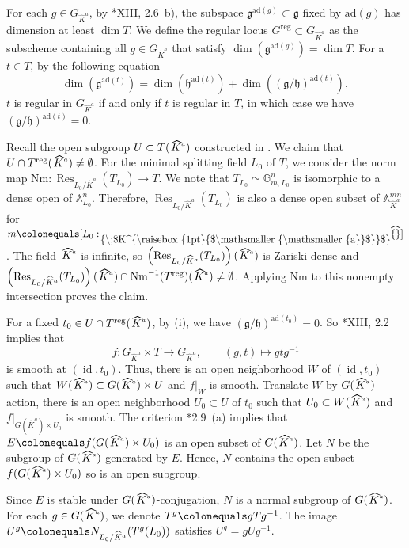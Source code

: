 \documentclass[a4paper,11pt,reqno]{amsart}
\newcommand{\bA}{\mathbb{A}}
\newcommand{\bG}{\mathbb{G}}
\newcommand{\fg}{\mathfrak{g}}
\newcommand{\fh}{\mathfrak{h}}
\newcommand{\ra}{\rightarrow}
\newcommand{\wh}{\widehat}
\newcommand{\ce}{\colonequals}
\newcommand{\isom}{\simeq}			                                               %
\newcommand{\hka}{\!\stackon[-8pt]{\;$K^{\raisebox{1pt}{$\mathsmaller{\mathsmaller{a}}$}}$}{\vstretch{1.5}{\hstretch{1.7}{\widehat{\phantom{}}}}}}
\newcommand{\nhka}{\wh{K}^a}
\providecommand{\p}[1]{\left(#1\right)}
\DeclareMathOperator{\id}{id}			                       %
\DeclareMathOperator{\Res}{Res}		                                                  %
\newcommand{\qq}{\quad\quad}
\newcommand{\reg}{^{\mathrm{reg}}}
\theoremstyle{plain}
\theoremstyle{remark}
\theoremstyle{definition}
\theoremstyle{plain}
\theoremstyle{definition}
\theoremstyle{subsection-tweak}
\theoremstyle{subsection-tweak}
\numberwithin{equation}{subsection}
\begin{document}
      For each $g\in G_{\nhka}$, by \cite{SGA3II}*{XIII, 2.6~b)}, the subspace $\fg^{\mathrm{ad}(g)}\subset \fg$ fixed by $\mathrm{ad}(g)$ has dimension at least $\dim T$. 
      We define the regular locus $G\reg\subset G_{\nhka}$ as the subscheme containing all $g\in G_{\nhka}$ that satisfy $\dim(\fg^{\mathrm{ad}(g)})=\dim T$.
      For a $t\in T$, by the following equation 
      \[
      \dim(\fg^{\mathrm{ad}(t)})=\dim(\fh^{\mathrm{ad}(t)})+\dim((\fg/\fh)^{\mathrm{ad}(t)}),
      \]
      $t$ is regular in $G_{\nhka}$ if and only if $t$ is regular in $T$, in which case we have $(\fg/\fh)^{\mathrm{ad}(t)}=0$. 
      \item Recall the open subgroup $U\subset T(\hka)$ constructed in .  We claim that $U\cap T^{\mathrm{reg}}(\hka)\neq \emptyset$. 
      For the minimal splitting field $L_0$ of $T$, we consider the norm map $\mathrm{Nm}\colon \Res_{L_0/\nhka}(T_{L_0})\ra T$.
      We note that $T_{L_0}\isom \bG_{m,L_0}^n$ is isomorphic to a dense open of $\bA^n_{L_0}$.
      Therefore, $\Res_{L_0/\nhka}(T_{L_0})$  is also a dense open subset of $\bA^{mn}_{\nhka}$ for $m\ce[L_0:\hka]$.
      The field $\hka$ is infinite, so $\p{\Res_{L_0/\nhka}(T_{L_0})}(\hka)$ is Zariski dense and $\p{\Res_{L_0/\nhka}(T_{L_0})}(\hka)\cap \mathrm{Nm}^{-1}(T^{\mathrm{reg}})(\hka)\neq \emptyset$.
      Applying $\mathrm{Nm}$ to this nonempty intersection proves the claim.
      \item For a fixed $t_{0}\in U\cap T\reg(\hka)$, by (i), we have $(\fg/\fh)^{\mathrm{ad}(t_0)}=0$. 
      So \cite{SGA3II}*{XIII, 2.2} implies that
      \[
      f\colon G_{\nhka}\times T\ra G_{\nhka}, \qq (g,t)\mapsto gtg^{-1}
      \]
      is smooth at $(\id, t_0)$.
      Thus, there is an open neighborhood $W$ of $(\id,t_0)$ such that $W(\hka)\subset G(\hka)\times U$ and $f|_{W}$ is smooth.
      Translate $W$ by $G(\hka)$-action, there is an open neighborhood $U_{0}\subset U$ of $t_{0}$ such that $U_{0}\subset W(\hka)$ and $f|_{G(\nhka)\times U_{0}}$ is smooth.
      The criterion \cite{Ces15d}*{2.9~(a)} implies that $E\ce f(G(\hka)\times U_{0})$ is an open subset of $G(\hka)$.
      Let $N$ be the subgroup of $G(\hka)$ generated by $E$.
      Hence, $N$ contains the open subset $f(G(\hka)\times U_0)$ so is an open subgroup. 
      \item Since $E$ is stable under $G(\hka)$-conjugation, $N$ is a normal subgroup of $G(\hka)$.
      For each $g\in G(\hka)$, we denote $T^{g}\ce gTg^{-1}$.
      The image $U^{g}\ce N_{L_0/\nhka}(T^g(L_0))$ satisfies $U^{g}=gUg^{-1}$. 
\end{document}
